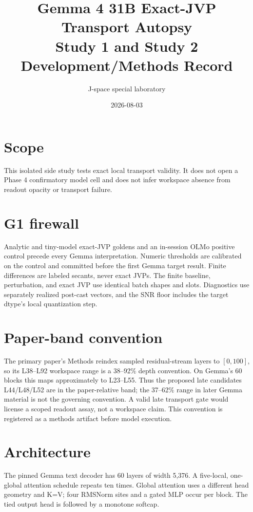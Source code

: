 \documentclass[11pt]{article}
\title{Gemma 4 31B Exact-JVP Transport Autopsy\\Study 1 and Study 2 Development/Methods Record}
\author{J-space special laboratory}
\date{2026-08-03}
\begin{document}
\maketitle
\section{Scope}
This isolated side study tests exact local transport validity. It does not
open a Phase 4 confirmatory model cell and does not infer workspace absence
from readout opacity or transport failure.
\section{G1 firewall}
Analytic and tiny-model exact-JVP goldens and an in-session OLMo positive
control precede every Gemma interpretation. Numeric thresholds are calibrated
on the control and committed before the first Gemma target result. Finite
differences are labeled secants, never exact JVPs.
The finite baseline, perturbation, and exact JVP use identical batch shapes
and slots. Diagnostics use separately realized post-cast vectors, and the SNR
floor includes the target dtype's local quantization step.
\section{Paper-band convention}
The primary paper's Methods reindex sampled residual-stream layers to
$[0,100]$, so its L38--L92 workspace range is a 38--92\% depth convention.
On Gemma's 60 blocks this maps approximately to L23--L55. Thus the proposed
late candidates L44/L48/L52 are in the paper-relative band; the 37--62\%
range in later Gemma material is not the governing convention. A valid late
transport gate would license a scoped readout assay, not a workspace claim.
This convention is registered as a methods artifact before model execution.
\section{Architecture}
The pinned Gemma text decoder has 60 layers of width 5,376. A five-local,
one-global attention schedule repeats ten times. Global attention uses a
different head geometry and K=V; four RMSNorm sites and a gated MLP occur per
block. The tied output head is followed by a monotone softcap.
\end{document}
